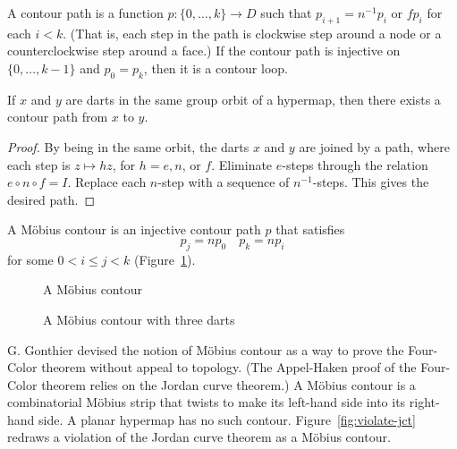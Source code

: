 \begin{definition}  A contour path is a function $p:\{0,\ldots,k\}\to D$
such that $p_{i+1} =
n^{-1} p_i$ or $f p_i$ for each $i<k$.  (That is, each
step in the path is clockwise step around a node or a
counterclockwise step around a face.)   If the contour path
is injective on $\{0,\ldots,k-1\}$
and  $p_0 = p_k$, then it is a contour loop.
\end{definition}

\begin{lemma}\label{lemma:connect-contour}  If $x$ and $y$ are darts
in the same group orbit of a hypermap, then there exists
a contour path from $x$ to $y$.
\end{lemma}

\begin{proof} 
By being in the same orbit, the darts
$x$ and $y$ are joined by a path, where each step
is $z\mapsto h z$, for $h=e,n$, or $f$.  Eliminate $e$-steps
through the relation $e\circ
n\circ f = I$.   Replace each $n$-step with a sequence of
$n^{-1}$-steps.  This gives the desired path.
\end{proof}

\begin{definition} A M\"obius contour is an
injective contour path $p$ that satisfies
    \begin{equation}
    \label{eqn:mobius}
    p_j = n p_0\quad p_k = n p_i
    \end{equation}
for some $0 < i\le j< k$ (Figure~\ref{fig:mobius}).
\end{definition}

\begin{figure}[htb]
  \centering
  \caption{A M\"obius contour}
  \label{fig:mobius}
\end{figure}

\begin{figure}[htb]
  \centering
  \caption{A M\"obius contour with three darts}
  \label{fig:3m}
\end{figure}


\begin{remark}
G. Gonthier devised the notion of M\"obius contour
as a way to prove the Four-Color theorem without appeal
to topology.  (The Appel-Haken
proof of the Four-Color theorem relies on the Jordan
curve theorem.)  A M\"obius contour is a 
combinatorial M\"obius strip that
twists to make 
its left-hand side into
its right-hand side.  A planar hypermap has no such contour.  
Figure~\ref{fig:violate-jct}
redraws a violation of the Jordan curve theorem
as a M\"obius contour.   
\end{remark}


